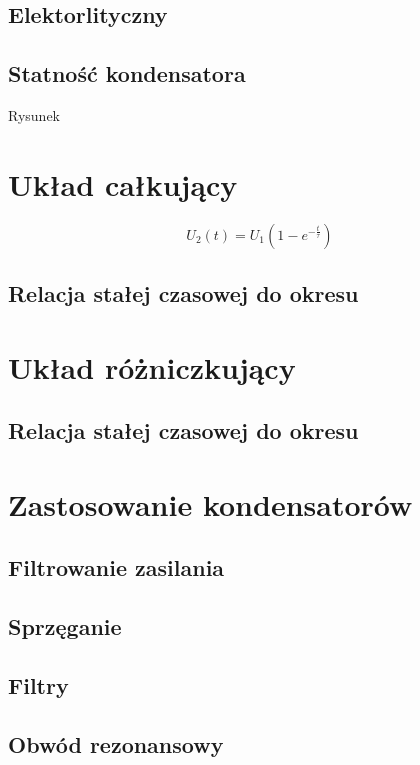\documentclass[11pt]{article}
\begin{document}
\subsection{Elektorlityczny}

\subsection{Statność kondensatora}
Rysunek

\newpage
\section{Układ całkujący}

$$ U_2(t) = U_1 \left( 1 - e^{-\frac{t}{\tau}} \right) $$

\subsection{Relacja stałej czasowej do okresu}


\section{Układ różniczkujący}

\subsection{Relacja stałej czasowej do okresu}

\section{Zastosowanie kondensatorów}
\subsection{Filtrowanie zasilania}

\subsection{Sprzęganie}

\subsection{Filtry}

\subsection{Obwód rezonansowy} 
\end{document}
